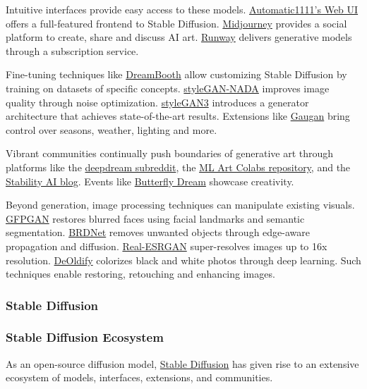Intuitive interfaces provide easy access to these models. \href{https://github.com/AUTOMATIC1111/stable-diffusion-webui}{Automatic1111's Web UI} offers a full-featured frontend to Stable Diffusion. \href{https://www.midjourney.com}{Midjourney} provides a social platform to create, share and discuss AI art. \href{https://www.runwayml.com}{Runway} delivers generative models through a subscription service.

Fine-tuning techniques like \href{https://arxiv.org/abs/2208.12242}{DreamBooth} allow customizing Stable Diffusion by training on datasets of specific concepts. \href{https://github.com/yfszzx/stylegan-nada}{styleGAN-NADA} improves image quality through noise optimization. \href{https://github.com/NVlabs/stylegan3}{styleGAN3} introduces a generator architecture that achieves state-of-the-art results. Extensions like \href{https://github.com/mit-han-lab/gaugan}{Gaugan} bring control over seasons, weather, lighting and more.

Vibrant communities continually push boundaries of generative art through platforms like the \href{https://www.reddit.com/r/deepdream/}{deepdream subreddit}, the \href{https://github.com/dvschultz}{ML Art Colabs repository}, and the \href{https://stability.ai/blog}{Stability AI blog}. Events like \href{https://www.elfman.ai/}{Butterfly Dream} showcase creativity.

Beyond generation, image processing techniques can manipulate existing visuals. \href{https://github.com/TencentARC/GFPGAN}{GFPGAN} restores blurred faces using facial landmarks and semantic segmentation. \href{https://github.com/dazhizhong/BRDNet}{BRDNet} removes unwanted objects through edge-aware propagation and diffusion. \href{https://github.com/xinntao/Real-ESRGAN}{Real-ESRGAN} super-resolves images up to 16x resolution. \href{https://github.com/jantic/DeOldify}{DeOldify} colorizes black and white photos through deep learning. Such techniques enable restoring, retouching and enhancing images.

\subsubsection{Stable Diffusion}

\subsubsection{Stable Diffusion Ecosystem}

As an open-source diffusion model, \href{https://arxiv.org/abs/2105.05233}{Stable Diffusion} has given rise to an extensive ecosystem of models, interfaces, extensions, and communities.

